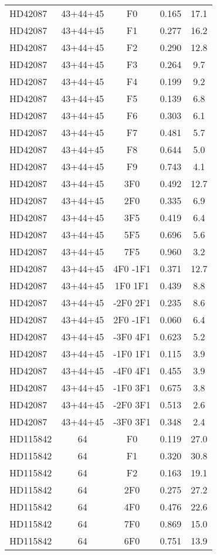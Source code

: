\begin{table*}
\begin{tabular}{l c c c c}
HD42087 & 43+44+45 & F0 & 0.165 & 17.1\\ 
HD42087 & 43+44+45 & F1 & 0.277 & 16.2\\ 
HD42087 & 43+44+45 & F2 & 0.290 & 12.8\\ 
HD42087 & 43+44+45 & F3 & 0.264 & 9.7\\ 
HD42087 & 43+44+45 & F4 & 0.199 & 9.2\\ 
HD42087 & 43+44+45 & F5 & 0.139 & 6.8\\ 
HD42087 & 43+44+45 & F6 & 0.303 & 6.1\\ 
HD42087 & 43+44+45 & F7 & 0.481 & 5.7\\ 
HD42087 & 43+44+45 & F8 & 0.644 & 5.0\\ 
HD42087 & 43+44+45 & F9 & 0.743 & 4.1\\ 
HD42087 & 43+44+45 & 3F0 & 0.492 & 12.7\\ 
HD42087 & 43+44+45 & 2F0 & 0.335 & 6.9\\ 
HD42087 & 43+44+45 & 3F5 & 0.419 & 6.4\\ 
HD42087 & 43+44+45 & 5F5 & 0.696 & 5.6\\ 
HD42087 & 43+44+45 & 7F5 & 0.960 & 3.2\\ 
HD42087 & 43+44+45 & 4F0 -1F1 & 0.371 & 12.7\\ 
HD42087 & 43+44+45 & 1F0 1F1 & 0.439 & 8.8\\ 
HD42087 & 43+44+45 & -2F0 2F1 & 0.235 & 8.6\\ 
HD42087 & 43+44+45 & 2F0 -1F1 & 0.060 & 6.4\\ 
HD42087 & 43+44+45 & -3F0 4F1 & 0.623 & 5.2\\ 
HD42087 & 43+44+45 & -1F0 1F1 & 0.115 & 3.9\\ 
HD42087 & 43+44+45 & -4F0 4F1 & 0.455 & 3.9\\ 
HD42087 & 43+44+45 & -1F0 3F1 & 0.675 & 3.8\\ 
HD42087 & 43+44+45 & -2F0 3F1 & 0.513 & 2.6\\ 
HD42087 & 43+44+45 & -3F0 3F1 & 0.348 & 2.4\\ 
\hline
HD115842 & 64 & F0 & 0.119 & 27.0\\ 
HD115842 & 64 & F1 & 0.320 & 30.8\\ 
HD115842 & 64 & F2 & 0.163 & 19.1\\ 
HD115842 & 64 & 2F0 & 0.275 & 27.2\\ 
HD115842 & 64 & 4F0 & 0.476 & 22.6\\ 
HD115842 & 64 & 7F0 & 0.869 & 15.0\\ 
HD115842 & 64 & 6F0 & 0.751 & 13.9\\ 

\end{tabular}
\end{table*}

